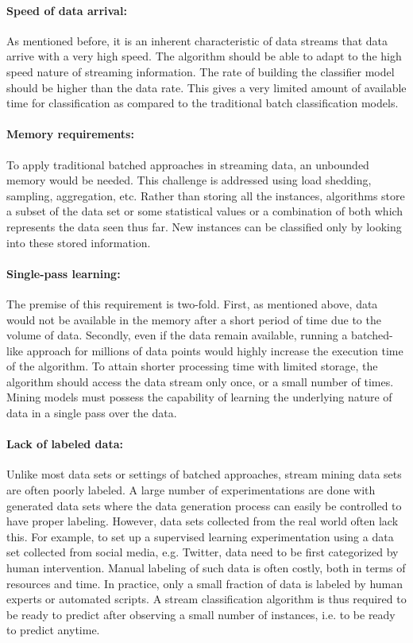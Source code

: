 \paragraph{Speed of data arrival:}
As mentioned before, it is an inherent characteristic of data streams that data arrive with a very high speed. The algorithm should be able to adapt to the high speed nature of streaming information. The rate of building the classifier model should be higher than the data rate. This gives a very limited amount of available time for classification as compared to the traditional batch classification models.

\paragraph{Memory requirements:}
To apply traditional batched approaches in streaming data, an unbounded memory would be needed. This challenge is  addressed using load shedding, sampling, aggregation, etc. Rather than storing all the instances, algorithms store a subset of the data set or some statistical values or a combination of both which represents the data seen thus far. New instances can be classified only by looking into these stored information. 

\paragraph{Single-pass learning:}
The premise of this requirement is two-fold. First, as mentioned above, data would not be available in the memory after a short period of time due to the volume of data. Secondly, even if the data remain available, running a batched-like approach for millions of data points would highly increase the execution time of the algorithm. To attain shorter processing time with limited storage, the algorithm should access the data stream only once, or a small number of times. Mining models must possess the capability of learning the underlying nature of data in a single pass over the data.

\paragraph{Lack of labeled data:}
Unlike most data sets or settings of batched approaches, stream mining data sets are often poorly labeled. A large number of experimentations are done with generated data sets where the data generation process can easily be controlled to have proper labeling. However, data sets collected from the real world often lack this. For example, to set up a supervised learning experimentation using a data set collected from social media, e.g. Twitter, data need to be first categorized by human intervention. Manual labeling of such data is often costly, both in terms of resources and time. In practice, only a small fraction of data is labeled by human experts or automated scripts. A stream classification algorithm is thus required to be ready to predict after observing a small number of instances, i.e. to be ready to predict anytime.

